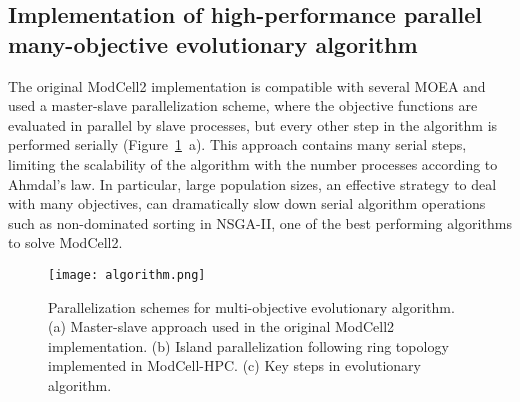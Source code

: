 {\subsection{Implementation of high-performance parallel many-objective evolutionary algorithm}

The original ModCell2 implementation \citep{garcia2019, garcia2019c} is compatible with several MOEA and used a master-slave parallelization scheme, where the objective functions are evaluated in parallel by slave processes, but every other step in the algorithm is performed serially (Figure~\ref{fig7:algorithm}~a).
This approach contains many serial steps, limiting the scalability of the algorithm with the number processes according to Ahmdal's law.\citep{hill2008}
In particular, large population sizes, an effective strategy to deal with many objectives,\citep{garcia2019c,ishibuchi2009} can dramatically slow down serial algorithm operations such as non-dominated sorting in NSGA-II, \citep{deb2002} one of the best performing algorithms to solve ModCell2.\citep{garcia2019c}%


\begin{figure}[h]
    \centering
    \texttt{[image: algorithm.png]}
    \caption[Parallelization schemes for multi-objective evolutionary algorithm]{Parallelization schemes for multi-objective evolutionary algorithm. (a) Master-slave approach used in the original ModCell2 implementation. (b) Island parallelization following ring topology implemented in ModCell-HPC. (c) Key steps in evolutionary algorithm.} %
    \label{fig7:algorithm}
\end{figure}


}
